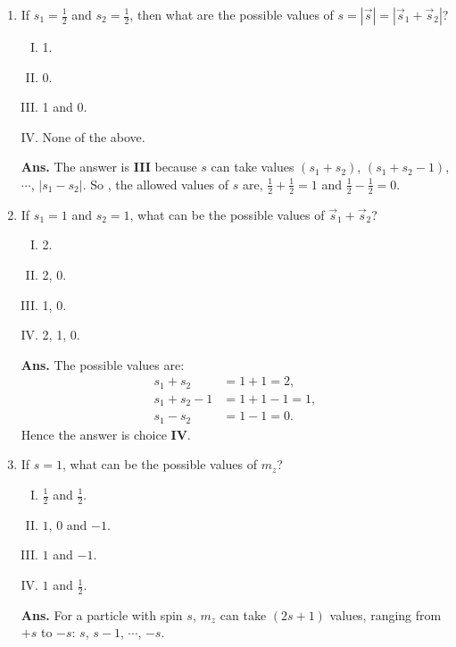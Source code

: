 \documentclass[12pt]{article}
\newcommand\half{\frac{1}{2}}
\newcommand\ls{\left |}
\newcommand\rs{\right |}
\begin{document}
\begin{enumerate}[1.]
\item If $s_1 = \half$ and $s_2 = \half$, then what are the possible values of $s = \ls \vec{s} \rs = \ls \vec{s}_1 + \vec{s}_2 \rs$?
       \begin{enumerate}[I.]
              \item 1.
              \item 0.
              \item 1 and 0.
              \item None of the above. \\ \newline
       \end{enumerate}
\textbf{Ans.} The answer is \textbf{III} because $s$ can take values $(s_1 + s_2)$, $(s_1 + s_2 - 1)$, $\cdots$, $\ls s_1 - s_2 \rs $. So , the allowed values of $s$ are, $\half + \half = 1$ and $\half - \half = 0$.
\item If $s_1=1$ and $s_2=1$, what can be the possible values of $\vec{s}_1+ \vec{s}_2$?
       \begin{enumerate}[I.]
              \item 2.
              \item 2, 0.
              \item 1, 0.
              \item 2, 1, 0. \\ \newline
       \end{enumerate}
\textbf{Ans.} The possible values are: $$
\begin{aligned}
s_1 + s_2 & = 1 + 1 = 2, \\
s_1 + s_2 - 1 & = 1 + 1 - 1 = 1, \\
s_1 - s_2 & = 1 - 1 = 0.
\end{aligned}
$$ 
Hence the answer is choice \textbf{IV}.
\newpage
\item If $s=1$, what can be the possible values of $m_z$?
       \begin{enumerate}[I.]
              \item $\half$ and $\half$.
              \item $1$, $0$ and $-1$.
              \item $1$ and $-1$.
              \item $1$ and $\half$. \\ \newline
       \end{enumerate}
\textbf{Ans.} For a particle with spin $s$, $m_z$ can take $(2s+1)$ values, ranging from $+s$ to $-s$: $s$, $s-1$, $\cdots$, $-s$. \newline

\end{enumerate}
\end{document}
